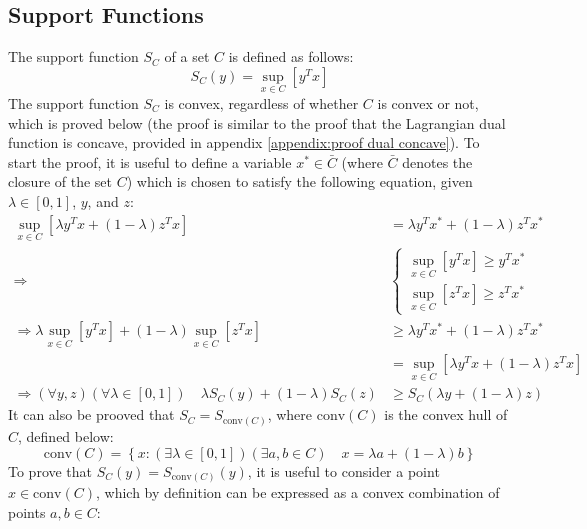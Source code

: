 \subsection{Support Functions} \label{section:support functions}
The support function $S_C$ of a set $C$ is defined as follows:
\begin{equation}
    S_C(y) = \underset{x\in C}{\sup}\left[ y^T x \right] \label{eq:support function}
\end{equation}
The support function $S_C$ is convex, regardless of whether $C$ is convex or not, which is proved below (the proof is similar to the proof that the Lagrangian dual function is concave, provided in appendix \ref{appendix:proof dual concave}). To start the proof, it is useful to define a variable $x^*\in\bar{C}$ (where $\bar{C}$ denotes the closure of the set $C$) which is chosen to satisfy the following equation, given $\lambda\in[0, 1]$, $y$, and $z$:
\begin{align*}
    \underset{x\in C}{\sup}\left[ \lambda y^T x + (1-\lambda) z^T x \right] &= \lambda y^T x^* + (1-\lambda) z^T x^* \\
    \Rightarrow & \begin{cases}
        \underset{x\in C}{\sup}\left[ y^T x \right] \ge y^T x^* \\
        \underset{x\in C}{\sup}\left[ z^T x \right] \ge z^T x^*
    \end{cases} \\
    \Rightarrow \lambda \underset{x\in C}{\sup}\left[ y^T x \right] + (1 - \lambda) \underset{x\in C}{\sup}\left[ z^T x \right] &\ge \lambda y^T x^* + (1 - \lambda) z^T x^* \\
    &= \underset{x\in C}{\sup}\left[ \lambda y^T x + (1-\lambda) z^T x \right] \\
    \Rightarrow (\forall y, z)(\forall\lambda\in[0, 1]) \quad \lambda S_C(y) + (1 - \lambda) S_C(z) &\ge S_C( \lambda y + (1 - \lambda) z )
\end{align*}
It can also be prooved that $S_C = S_{\text{conv}(C)}$, where $\text{conv}(C)$ is the convex hull of $C$, defined below:
\begin{equation}
    \text{conv}(C) = \left\{ x:(\exists\lambda\in[0, 1])(\exists a, b \in C) \quad x = \lambda a + (1 - \lambda) b \right\}
\end{equation}
To prove that $S_C(y) = S_{\text{conv}(C)}(y)$, it is useful to consider a point $x\in \text{conv}(C)$, which by definition can be expressed as a convex combination of points $a, b \in C$:
